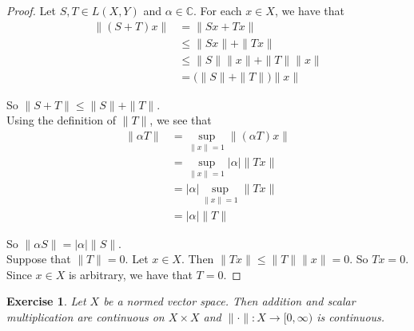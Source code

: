 \documentclass[12pt]{amsart}
\newtheorem{ex}[thm]{Exercise}
\newcommand{\al}{\alpha}
\newcommand{\C}{\mathbb{C}}
\newcommand{\Rg}{[0,\infty)}
\begin{document}
	\begin{proof}
		Let $S,T \in L(X,Y)$ and $\al \in \C$. For each $x \in X$, we have that 
		\begin{align*}
			\|(S+T)x \|
			&= \|Sx+Tx \|\\
			& \leq \|Sx \|+ \|Tx \|\\
			&\leq \|S \|\|x \|+ \|T \|\|x \|\\
			&= \big(\|S \|+ \|T \|\big) \|x \|
		\end{align*}
		
		So $\|S+T \|\leq \|S \|+ \|T \|$.\vspace{1cm}\\
		
		Using the definition of $\|T \|$, we see that 
		\begin{align*}
			\|\al T \|
			&= \sup_{\|x \|=1} \|(\al T)x \|\\
			&= \sup_{\|x \|=1} \vert \al \vert \|Tx \|\\
			&=\vert \al \vert \sup_{\|x \|=1} \|Tx \|\\
			&=\vert \al \vert \|T \|
		\end{align*} 
		
		So $\|\al S \|= \vert \al \vert \|S \|$. \vspace{1cm}\\ Suppose that $\|T \|= 0$. Let $x \in X$. Then $\|T x\|\leq \|T \|\|x \|= 0$. So $Tx=0$. Since $x \in X$ is arbitrary, we have that $T=0$. 
	\end{proof}
	
	\begin{ex}
		Let $X$ be a normed vector space. Then addition and scalar multiplication are continuous on $X \times X$ and $\|\cdot \|:X \rightarrow \Rg$ is continuous.
	\end{ex}
	
\end{document}
